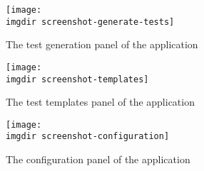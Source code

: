 \noindent 

\begin{figure}[!htbp]
  \centering
  \texttt{[image: \\imgdir screenshot-generate-tests]}
  \caption{The test generation panel of the application}
\label{fig:screenshot-screenshot-generate-tests}
\end{figure}

\begin{figure}[!htbp]
  \centering
  \texttt{[image: \\imgdir screenshot-templates]}
  \caption{The test templates panel of the application}
\label{fig:screenshot-templates}
\end{figure}

\begin{figure}[!htbp]
  \centering
  \texttt{[image: \\imgdir screenshot-configuration]}
  \caption{The configuration panel of the application}
\label{fig:screenshot-configuration}
\end{figure}